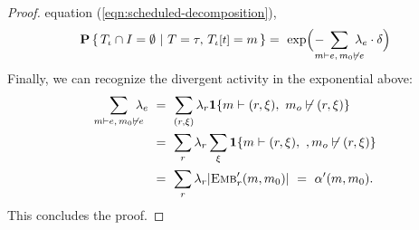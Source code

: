 \begin{proof}
  equation (\ref{eqn:scheduled-decomposition}),
 \begin{equation*}
       \CProb{ \ATRAJ{} \cap I = \emptyset }
       { T=\tau,\,\TSTATE{t}{\ATRAJ{}} = m }
       = \ 
      \exp{ \! \Big ( \!- \hspace{-1em} \sum_{m \vdash e, \, m_0 \not\vdash
      e} \hspace{-0.9em} \lambda_e \cdot \delta \Big ) }
  \end{equation*}
  Finally, we can recognize the divergent activity in the exponential
  above:
  \vskip 0.0cm
  \begin{equation*}
    \begin{aligned}
      \sum_{m \vdash e, \, m_0 \not\vdash e} \hspace{-0.8em} \lambda_e \ 
      &= \ \sum_{(r, \xi)} \lambda_r \textbf{1}\{ m \vdash (r, \xi),\ m_o \not\vdash (r, \xi) \} \\
      &= \ \sum_r \lambda_r\sum_\xi \textbf{1}\{ m \vdash (r, \xi),\ ,m_o \not\vdash (r, \xi) \} \\
      &= \ \sum_r \lambda_r |\DEMBS{r}{m, m_0}|
      \ = \ \alpha'(m, m_0).
    \end{aligned}
  \end{equation*}
  \vskip 0.2cm
  \noindent This concludes the proof.
\end{proof}